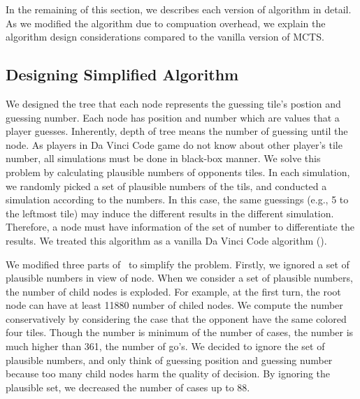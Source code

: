In the remaining of this section, we describes each version of algorithm in detail. 
As we modified the algorithm due to compuation overhead, we explain the algorithm design considerations compared to the vanilla version of MCTS.

\subsection{Designing Simplified Algorithm}

We designed the tree that each node represents the guessing tile's postion and guessing number.
Each node has position and number which are values that a player guesses.
Inherently, depth of tree means the number of guessing until the node.
As players in Da Vinci Code game do not know about other player's tile number, all simulations must be done in black-box manner.
We solve this problem by calculating plausible numbers of opponents tiles.
In each simulation, we randomly picked a set of plausible numbers of the tils, and conducted a simulation according to the numbers.
In this case, the same guessings (e.g., 5 to the leftmost tile) may induce the different results in the different simulation.
Therefore, a node must have information of the set of number to differentiate the results.
We treated this algorithm as a vanilla Da Vinci Code algorithm (\md).



We modified three parts of \md~to simplify the problem.
Firstly, we ignored a set of plausible numbers in view of node.
When we consider a set of plausible numbers, the number of child nodes is exploded.
For example, at the first turn, the root node can have at least 11880 number of chiled nodes.
We compute the number conservatively by considering the case that the opponent have the same colored four tiles.
Though the number is minimum of the number of cases, the number is much higher than 361, the number of go's.
We decided to ignore the set of plausible numbers, and only think of guessing position and guessing number because too many child nodes harm the quality of decision.
By ignoring the plausible set, we decreased the number of cases up to 88.

